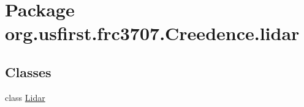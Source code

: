 \hypertarget{namespaceorg_1_1usfirst_1_1frc3707_1_1_creedence_1_1lidar}{}\section{Package org.\+usfirst.\+frc3707.\+Creedence.\+lidar}
\label{namespaceorg_1_1usfirst_1_1frc3707_1_1_creedence_1_1lidar}
\subsection*{Classes}
\begin{DoxyCompactItemize}
\item 
class \mbox{\hyperlink{classorg_1_1usfirst_1_1frc3707_1_1_creedence_1_1lidar_1_1_lidar}{Lidar}}
\end{DoxyCompactItemize}
